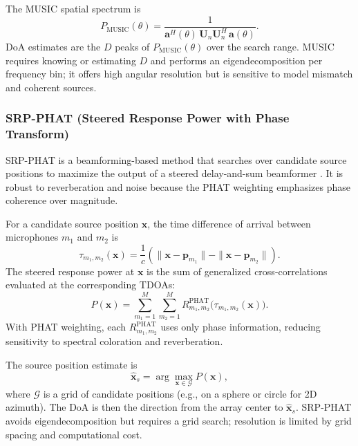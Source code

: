 \documentclass[12pt, titlepage]{article}
\begin{document}
The MUSIC spatial spectrum is
\begin{equation}
  P_{\mathrm{MUSIC}}(\theta) = \frac{1}{\mathbf{a}^H(\theta) \,
  \mathbf{U}_n \mathbf{U}_n^H \, \mathbf{a}(\theta)}.
\end{equation}
DoA estimates are the $D$ peaks of $P_{\mathrm{MUSIC}}(\theta)$ over the search
range. MUSIC requires knowing or estimating $D$ and performs an eigendecomposition
per frequency bin; it offers high angular resolution but is sensitive to
model mismatch and coherent sources.

\subsubsection{SRP-PHAT (Steered Response Power with Phase Transform)}
\label{sec:srpphat}

SRP-PHAT is a beamforming-based method that searches over candidate source
positions to maximize the output of a steered delay-and-sum beamformer
\cite{DiBiase2000}. It is robust to reverberation and noise because the PHAT
weighting emphasizes phase coherence over magnitude.

For a candidate source position $\mathbf{x}$, the time difference of arrival
between microphones $m_1$ and $m_2$ is
\begin{equation}
  \tau_{m_1,m_2}(\mathbf{x}) = \frac{1}{c} \left( \|\mathbf{x} -
  \mathbf{p}_{m_1}\| - \|\mathbf{x} - \mathbf{p}_{m_2}\| \right).
\end{equation}
The steered response power at $\mathbf{x}$ is the sum of generalized
cross-correlations evaluated at the corresponding TDOAs:
\begin{equation}
  P(\mathbf{x}) = \sum_{m_1=1}^{M} \sum_{m_2=1}^{M} R_{m_1,m_2}^{\mathrm{PHAT}}
  \bigl( \tau_{m_1,m_2}(\mathbf{x}) \bigr).
\end{equation}
With PHAT weighting, each $R_{m_1,m_2}^{\mathrm{PHAT}}$ uses only phase
information, reducing sensitivity to spectral coloration and reverberation.

The source position estimate is
\begin{equation}
  \hat{\mathbf{x}}_s = \arg\max_{\mathbf{x} \in \mathcal{G}} P(\mathbf{x}),
\end{equation}
where $\mathcal{G}$ is a grid of candidate positions (e.g., on a sphere or
circle for 2D azimuth). The DoA is then the direction from the array center to
$\hat{\mathbf{x}}_s$. SRP-PHAT avoids eigendecomposition but requires a grid
search; resolution is limited by grid spacing and computational cost.
\end{document}
